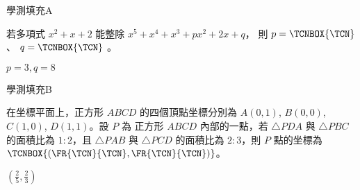     \begin{QUESTION}
        \begin{ExamInfo}{94}{學測}{填充}{A}
        \end{ExamInfo}
        \begin{ExamAnsRateInfo}{69}{92}{82}{33}
        \end{ExamAnsRateInfo}
        \begin{QBODY}
            若多項式 $x^2 +x+2$ 能整除 $x^5 + x^4 +x^3 +px^2 +2x+q$，
			則 $p= \TCNBOX{\TCN}$、 $q=\TCNBOX{\TCN}$ 。
        \end{QBODY}
        \begin{QFROMS}
        \end{QFROMS}
        \begin{QTAGS}\end{QTAGS}
        \begin{QANS}
            $p=3,q=8$
        \end{QANS}
        \begin{QSOLLIST}
        \end{QSOLLIST}
        \begin{QEMPTYSPACE}
        \end{QEMPTYSPACE}
    \end{QUESTION}
    \begin{QUESTION}
        \begin{ExamInfo}{94}{學測}{填充}{B}
        \end{ExamInfo}
        \begin{ExamAnsRateInfo}{39}{78}{34}{5}
        \end{ExamAnsRateInfo}
        \begin{QBODY}
            在坐標平面上，正方形 $ABCD$ 的四個頂點坐標分別為 $A(0,1)$, $B(0,0)$, $C(1,0)$, $D(1,1)$。設 $P$ 為 正方形 $ABCD$ 內部的一點，若 $\triangle PDA$ 與 $\triangle PBC$ 的面積比為 $1:2$，且 $\triangle PAB$ 與 $\triangle PCD$ 的面積比為 $2:3$，則 $P$ 點的坐標為 $\TCNBOX{ (\FR{\TCN}{\TCN}, \FR{\TCN}{\TCN})}$。
        \end{QBODY}
        \begin{QFROMS}
        \end{QFROMS}
        \begin{QTAGS}\end{QTAGS}
        \begin{QANS}
            $(\frac{2}{5},\frac{2}{3})$
        \end{QANS}
        \begin{QSOLLIST}
        \end{QSOLLIST}
        \begin{QEMPTYSPACE}
        \end{QEMPTYSPACE}
    \end{QUESTION}
